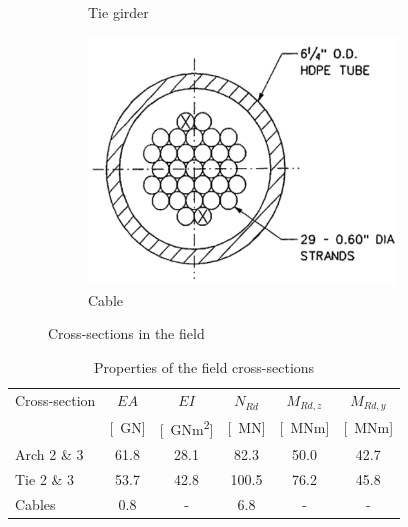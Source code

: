 \begin{figure}[H]
\begin{subfigure}{.33\textwidth}
    \caption{Tie girder}
    \label{fig:cs_tie}
\end{subfigure}%
\begin{subfigure}{.33\textwidth}
    \centering
    \vspace*{1.35cm}
    \includegraphics[width=0.9\textwidth]{overleaf/Appendix/Pictures/cable_3.PNG}
    \vspace*{1.35cm}
    \caption{Cable}
    \label{fig:cs_cable}
\end{subfigure}\caption{Cross-sections in the field}
\label{fig:cross_sections}
\end{figure}

\begin{table}[H]
    \centering
    \caption{Properties of the field cross-sections}
    \label{tab:cs_properties}
    \begin{tabular}{lccccc}
    \toprule
    Cross-section & $EA$ & $EI$ & $N_{Rd}$ & $M_{Rd,z}$ & $M_{Rd,y}$ \\
                  & [\SI{}{GN}]   & [\SI{}{GNm^2}]   & [\SI{}{MN}]  & [\SI{}{MNm}]  & [\SI{}{MNm}] \\ \midrule
    Arch 2 \& 3 & 61.8 & 28.1 & 82.3 & 50.0 & 42.7 \\
    Tie 2 \& 3  & 53.7 & 42.8 & 100.5 & 76.2 & 45.8 \\
    Cables        & 0.8 &  - & 6.8 & - & - \\ \bottomrule
    \end{tabular}
\end{table}

